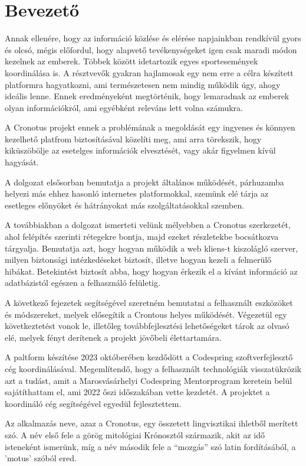 \chapter{Bevezető}%

Annak ellenére, hogy az információ közlése és elérése napjainkban rendkívül gyors és olcsó, mégis előfordul, hogy alapvető tevékenységeket igen csak maradi módon kezelnek az emberek. Többek között idetartozik egyes sportesemények koordinálása is. A résztvevők gyakran hajlamosak egy nem erre a célra készített platformra hagyatkozni, ami természetesen nem mindig működik úgy, ahogy ideális lenne. Ennek eredményeként megtörténik, hogy lemaradnak az emberek olyan információkról, ami egyébként releváns lett volna számukra.

A Cronotus projekt ennek a problémának a megoldását egy ingyenes és könnyen kezelhető platfrom biztosításával közelíti meg, ami arra törekszik, hogy kiküszöbölje az esetelges információk elvesztését, vagy akár figyelmen kívül hagyását.

A dolgozat elsősorban bemutatja a projekt általános működését, párhuzamba helyezi más ehhez hasonló internetes platformokkal, szemünk elé tárja az esetleges előnyöket és hátrányokat más szolgáltatásokkal szemben.

A továbbiakban a dolgozat ismerteti velünk mélyebben a Cronotus szerkezetét, ahol felépítés szerinti rétegekre bontja, majd ezeket részletekbe bocsátkozva tárgyalja. Bemutatja azt, hogy hogyan működik a web kliens-t kiszolágló szerver, milyen biztonsági intézkedéseket biztosít, illetve hogyan kezeli a felmerülő hibákat. Betekintést biztosít abba, hogy hogyan érkezik el a kívánt információ az adatbázistól egészen a felhasználó felületig.

A következő fejezetek segítségével szeretném bemutatni a felhasznált eszközöket és módszereket, melyek elősegítik a Crontous helyes működését. Végezetül egy következtetést vonok le, illetőleg továbbfejlesztési lehetőségeket tárok az olvasó elé, melyek fényt derítenek a projekt jövőbeli élettartamára.

A paltform készítése 2023 októberében kezdődött a Codespring szoftverfejlesztő cég koordinálásával. Megemlítendő, hogy a felhasznált technológiák visszatükrözik azt a tudást, amit a Marosvásárhelyi Codespring Mentorprogram keretein belül sajátíthattam el, ami 2022 őszi időszakában vette kezdetét. A projektet a koordináló cég segítségével egyedül fejlesztettem.

Az alkalmazás neve, azaz a Cronotus, egy összetett lingvisztikai ihletből merített szó. A név első fele a görög mitológiai Krónosztól származik, akit az idő isteneként ismerünk, míg a név második fele a ``mozgás'' szó latin fordításából, a 'motus' szóból ered.